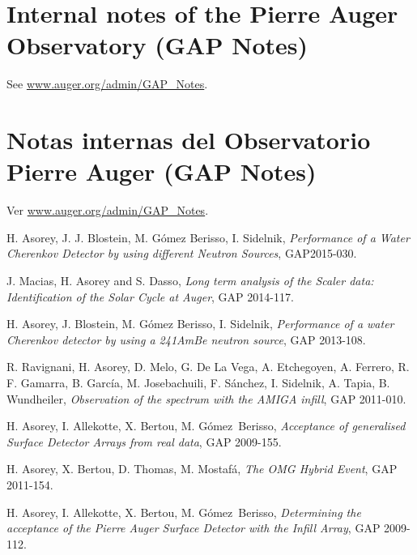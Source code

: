 \ifeng
\section*{Internal notes of the Pierre Auger Observatory (GAP Notes)}

See \href{http://www.auger.org/admin-cgi-bin/woda/gap\_notes.pl/Search?search=asorey}{www.auger.org/admin/GAP\_Notes}.
\else
\section*{Notas internas del Observatorio Pierre Auger (GAP Notes)}

Ver \href{http://www.auger.org/admin-cgi-bin/woda/gap\_notes.pl/Search?search=asorey}{www.auger.org/admin/GAP\_Notes}.
\fi

\noindent
\begin{etaremune}

\item {} H. Asorey, J. J. Blostein, M. Gómez Berisso, I. Sidelnik, {\emph{Performance of a Water Cherenkov Detector by using different Neutron Sources}}, GAP2015-030.

\item {} J. Macias, H. Asorey and S. Dasso, {\emph{Long term analysis of the Scaler data: Identification of the Solar Cycle at Auger}}, GAP 2014-117.

\item {} H. Asorey, J. Blostein, M. Gómez Berisso, I. Sidelnik, {\emph{Performance of a water Cherenkov detector by using a 241AmBe neutron source}}, GAP 2013-108.

\item {} R. Ravignani, H. Asorey, D. Melo, G. De La Vega, A. Etchegoyen, A. Ferrero, R. F. Gamarra, B. García, M. Josebachuili, F. Sánchez, I. Sidelnik, A. Tapia, B. Wundheiler, {\emph{Observation of the spectrum with the AMIGA infill}}, GAP 2011-010.

\item {}H. Asorey, I. Allekotte, X. Bertou, M. Gómez~Berisso, {\emph{Acceptance of generalised Surface Detector Arrays from real data}}, GAP 2009-155.

\item {}H. Asorey, X. Bertou, D. Thomas, M. Mostafá, {\emph{The OMG Hybrid Event}}, GAP 2011-154.

\item {}H. Asorey, I. Allekotte, X. Bertou, M. Gómez~Berisso, {\emph{Determining the acceptance of the Pierre Auger Surface Detector with the Infill Array}}, GAP 2009-112.


\end{etaremune}
